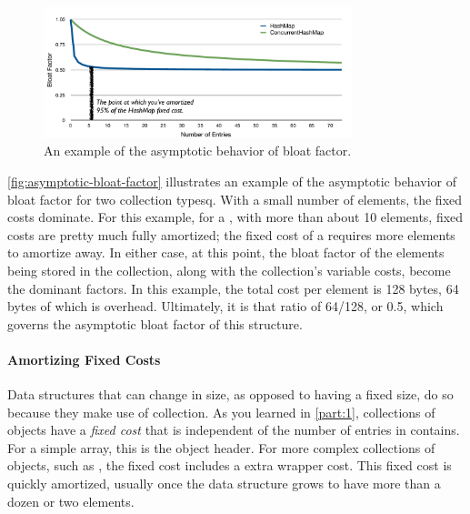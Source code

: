 

\begin{figure}
\centering
\includegraphics[width=0.8\textwidth]{part3/Figures/assessing/asymptote}
\caption{An example of the asymptotic behavior of bloat factor.}
\label{fig:asymptotic-bloat-factor}
\end{figure}

\autoref{fig:asymptotic-bloat-factor} illustrates an example of the asymptotic
behavior of bloat factor for two collection typesq. With a small number of
elements, the fixed costs dominate. For this example, for a ,
with more than about 10 elements, fixed costs are pretty much fully amortized;
the fixed cost of a  requires more elements to amortize
away. In either case, at this point, the bloat factor of the elements being
stored in the collection, along with the collection's variable costs, become the
dominant factors. In this example, the total cost per element is 128 bytes, 64
bytes of which is overhead. Ultimately, it is that ratio of 64/128, or 0.5,
which governs the asymptotic bloat factor of this structure.

\paragraph{Amortizing Fixed Costs}
Data structures that can change in size, as opposed to having a fixed size,  do
so because they make use of collection. As you learned in \autoref{part:1},
collections of objects have a \emph{fixed cost} that is independent of the
number of entries in contains. For a simple array, this is the \jre object
header. For more complex collections of objects, such as
, the fixed cost includes a extra wrapper cost. This
fixed cost is quickly amortized, usually once the data structure grows to have
more than a dozen or two elements.

